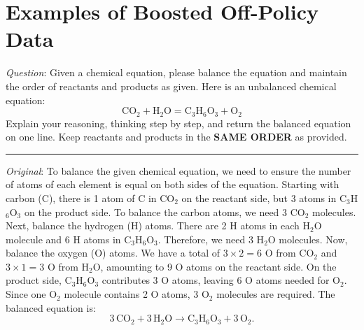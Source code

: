 \documentclass{article}
\begin{document}




\newpage


\appendix

\section{Examples of Boosted Off-Policy Data}\label{apx:examp}


\begin{center}
\begin{tcolorbox}[
    enhanced,
    width=\linewidth,
    fit to height=11.5cm,
    colback=green!4,
    colframe=green!50!black,
    boxrule=0.5pt,
    arc=2pt,
    title=\small{Chemistry (Olmo-3-7B-Instruct)},
    left=2pt,
    right=2pt,
    top=1pt,
    bottom=0pt
]
{\small
\textit{Question}: Given a chemical equation, please balance the equation and maintain the order of reactants and products as given. Here is an unbalanced chemical equation:
\[
\mathrm{CO}_2 + \mathrm{H}_2\mathrm{O}
=
\mathrm{C}_3\mathrm{H}_6\mathrm{O}_3 + \mathrm{O}_2
\]
Explain your reasoning, thinking step by step, and return the balanced equation on one line. Keep reactants and products in the \textbf{SAME ORDER} as provided.

\vspace{0.8em}
\noindent\rule{\linewidth}{0.4pt}
\vspace{0.2em}

\textit{Original}: To balance the given chemical equation, we need to ensure the number of atoms of each element is equal on both sides of the equation. Starting with carbon (C), there is 1 atom of C in CO$_2$ on the reactant side, but 3 atoms in C$_3$H$_6$O$_3$ on the product side. To balance the carbon atoms, we need 3 CO$_2$ molecules. Next, balance the hydrogen (H) atoms. There are 2 H atoms in each H$_2$O molecule and 6 H atoms in C$_3$H$_6$O$_3$. Therefore, we need 3 H$_2$O molecules. Now, balance the oxygen (O) atoms. We have a total of $3 \times 2 = 6$ O from CO$_2$ and $3 \times 1 = 3$ O from H$_2$O, amounting to 9 O atoms on the reactant side. On the product side, C$_3$H$_6$O$_3$ contributes 3 O atoms, leaving 6 O atoms needed for O$_2$. Since one O$_2$ molecule contains 2 O atoms, 3 O$_2$ molecules are required. The balanced equation is:
\[
3\,\mathrm{CO}_2 + 3\,\mathrm{H}_2\mathrm{O}
\rightarrow
\mathrm{C}_3\mathrm{H}_6\mathrm{O}_3 + 3\,\mathrm{O}_2.
\]

}
\end{tcolorbox}
\end{center}
\end{document}
